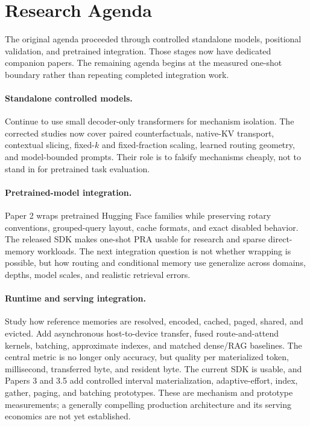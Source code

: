 \documentclass[11pt]{article}
\begin{document}
\section{Research Agenda}

\iffalse

The original agenda proceeded through controlled standalone models, positional validation,
and pretrained integration. Those stages now have dedicated companion papers. The remaining
agenda begins at the measured one-shot boundary rather than repeating completed integration
work.

\paragraph{Standalone controlled models.}
Continue to use small decoder-only transformers for mechanism isolation. The corrected studies
now cover paired counterfactuals, native-KV transport, contextual slicing, fixed-$k$ and
fixed-fraction scaling, learned routing geometry, and model-bounded prompts. Their role is to
falsify mechanisms cheaply, not to stand in for pretrained task evaluation.

\paragraph{Pretrained-model integration.}
Paper 2 wraps pretrained Hugging Face families while preserving rotary conventions,
grouped-query layout, cache formats, and exact disabled behavior. The released SDK makes
one-shot PRA usable for research and sparse direct-memory workloads. The next integration
question is not whether wrapping is possible, but how routing and conditional memory use
generalize across domains, depths, model scales, and realistic retrieval errors.

\paragraph{Runtime and serving integration.}
Study how reference memories are resolved, encoded, cached, paged, shared, and evicted. Add
asynchronous host-to-device transfer, fused route-and-attend kernels, batching, approximate
indexes, and matched dense/RAG baselines. The central metric is no longer only accuracy, but
quality per materialized token, millisecond, transferred byte, and resident byte. The current
SDK is usable, and Papers 3 and 3.5 add controlled interval materialization, adaptive-effort,
index, gather, paging, and batching prototypes.  These are mechanism and prototype measurements;
a generally compelling production architecture and its serving economics are not yet established.
\end{document}
